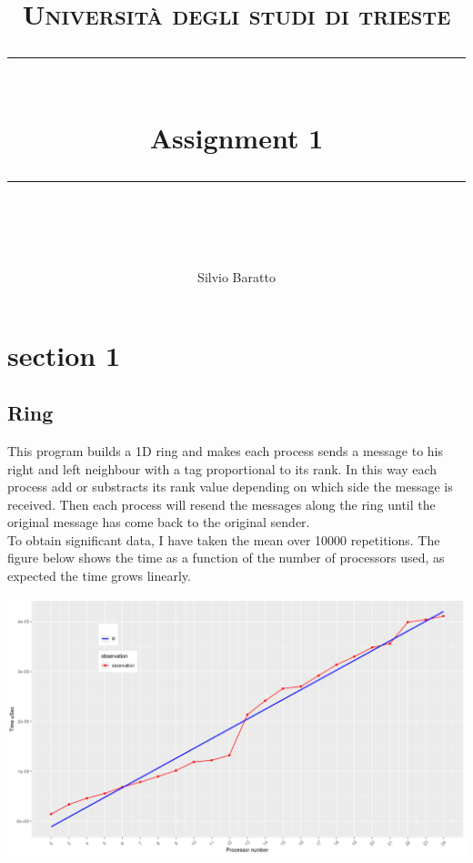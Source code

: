 \documentclass[11pt,a4paper]{report}
\theoremstyle{definition}
\begin{document}
\newcommand{\horrule}[1]{\rule{\linewidth}{#1}}
\lstset{language=Java} 
\lstset{basicstyle=\footnotesize\ttfamily}
\author{Silvio Baratto}
\title{
\normalfont \normalsize 
\textsc{Università degli studi di trieste} \\ [25pt] %
\horrule{0.5pt} \\[0.4cm] %
\huge Assignment 1\\ %
\horrule{2pt} \\[0.5cm] %
}
\maketitle
\tableofcontents
\chapter{section 1}
\section{Ring}
This program builds a 1D ring and makes each process sends a message to his right and left neighbour with a tag proportional to its rank. In this way each process add or substracts its rank value depending on which side the message is received. Then each process will resend the messages along the ring until the original message has come back to the original sender. \\
To obtain significant data, I have taken the mean over 10000 repetitions. The figure below shows the time as a function of the number of processors used, as expected the time grows linearly.
\begin{center}
\includegraphics[scale=.45]{ring}
\end{center}
\end{document}
